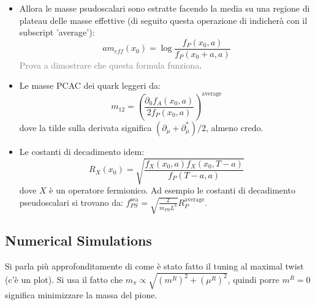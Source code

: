 \documentclass[12pt,a4paper,openright]{article}
\newcommand{\colr}{\textcolor{BrickRed}}
\begin{document}
\begin{itemize}
  \item Allora le masse psudoscalari sono estratte facendo la media su una regione di plateau delle masse effettive (di seguito questa operazione di indicherà con il subscript 'average'):
        \begin{equation*}
          am_{eff} (x_0) = \log \frac{f_P (x_0, a)}{f_P (x_0 +a, a)}
        \end{equation*}
        \textcolor{gray}{Prova a dimostrare che questa formula funziona}.
  \item Le masse PCAC dei quark leggeri da:
        \begin{equation*}
          m_{12} = \left(\frac{\tilde\partial_0 f_A (x_0, a)}{2f_P(x_0,a)}\right)^\text{average}
        \end{equation*}
        dove la tilde sulla derivata significa $(\partial_\mu + \partial_\mu^*)/2$, \colr{almeno credo}.
  \item Le costanti di decadimento idem:
        \begin{equation*}
          R_X (x_0) = \sqrt{\frac{f_X (x_0, a) f_X (x_0,T- a)}{f_P (T-a, a)}}
        \end{equation*}
        dove $X$ è un operatore fermionico. Ad esempio le costanti di decadimento pseudoscalari si trovano da: $f_{PS}^{\text{sea}} = \sqrt{\frac{2}{m_{PS}L^3}}R_P^{\text{average}}$.
\end{itemize}

\subsection{Numerical Simulations}
Si parla più approfonditamente di come è stato fatto il tuning al maximal twist (c'è un plot). Si usa il fatto che $m_\pi \propto \sqrt{(m^R)^2 + (\mu^R)^2}$, quindi porre $m^R =0$ significa minimizzare la massa del pione.

\newpage
\end{document}
